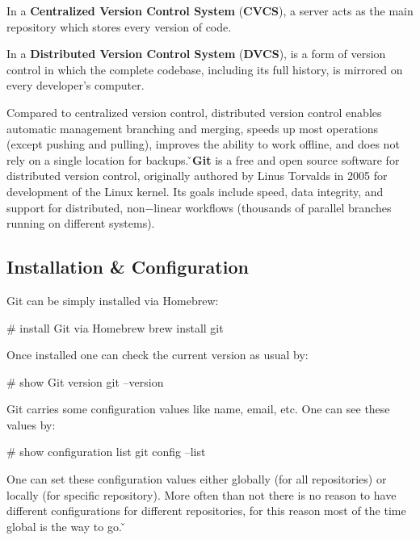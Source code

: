 In a \textbf{Centralized Version Control System} (\textbf{CVCS}), a server acts as the main repository which stores
every version of code.
\ed

In a \textbf{Distributed Version Control System} (\textbf{DVCS}), is a form of version control in which the complete
codebase, including its full history, is mirrored on every developer's computer.
\ed

Compared to centralized version control, distributed version control enables automatic management branching and
merging, speeds up most operations (except pushing and pulling), improves the ability to work offline, and does not
rely on a single location for backups. \v

\bd[Git]
\textbf{Git} is a free and open source software for distributed version control, originally authored by Linus
Torvalds in 2005 for development of the Linux kernel. Its goals include speed, data integrity, and support for
distributed, non$-$linear workflows (thousands of parallel branches running on different systems).
\ed

\subsection{Installation \& Configuration}

Git can be simply installed via Homebrew:

\begin{bash}
# install Git via Homebrew
brew install git
\end{bash}

Once installed one can check the current version as usual by:

\begin{bash}
# show Git version
git --version
\end{bash}

Git carries some configuration values like name, email, etc. One can see these values by:

\begin{bash}
# show configuration list
git config --list
\end{bash}

One can set these configuration values either globally (for all repositories) or locally (for specific repository).
More often than not there is no reason to have different configurations for different repositories, for this reason
most of the time global is the way to go. \v

